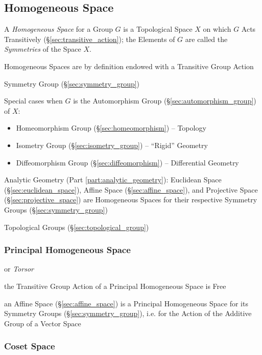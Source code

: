 \subsection{Homogeneous Space}\label{sec:homogeneous_space}

A \emph{Homogeneous Space} for a Group $G$ is a Topological Space $X$ on which
$G$ Acts Transitively (\S\ref{sec:transitive_action}); the Elements of $G$ are
called the \emph{Symmetries} of the Space $X$.

Homogeneous Spaces are by definition endowed with a Transitive Group Action

Symmetry Group (\S\ref{sec:symmetry_group})

Special cases when $G$ is the Automorphism Group
(\S\ref{sec:automorphism_group}) of $X$:
\begin{itemize}
  \item Homeomorphism Group (\S\ref{sec:homeomorphism}) -- Topology
  \item Isometry Group (\S\ref{sec:isometry_group}) -- ``Rigid'' Geometry
  \item Diffeomorphism Group (\S\ref{sec:diffeomorphism}) -- Differential
    Geometry
\end{itemize}

Analytic Geometry (Part \ref{part:analytic_geometry}): Euclidean Space
(\S\ref{sec:euclidean_space}), Affine Space (\S\ref{sec:affine_space}), and
Projective Space (\S\ref{sec:projective_space}) are Homogeneous Spaces for their
respective Symmetry Groups (\S\ref{sec:symmetry_group})

Topological Groups (\S\ref{sec:topological_group})



\subsubsection{Principal Homogeneous Space}
\label{sec:principal_homogeneous_space}

or \emph{Torsor}

the Transitive Group Action of a Principal Homogeneous Space is Free

an Affine Space (\S\ref{sec:affine_space}) is a Principal Homogeneous Space for
its Symmetry Groups (\S\ref{sec:symmetry_group}), i.e. for the Action of the
Additive Group of a Vector Space



\subsubsection{Coset Space}\label{sec:coset_space}



